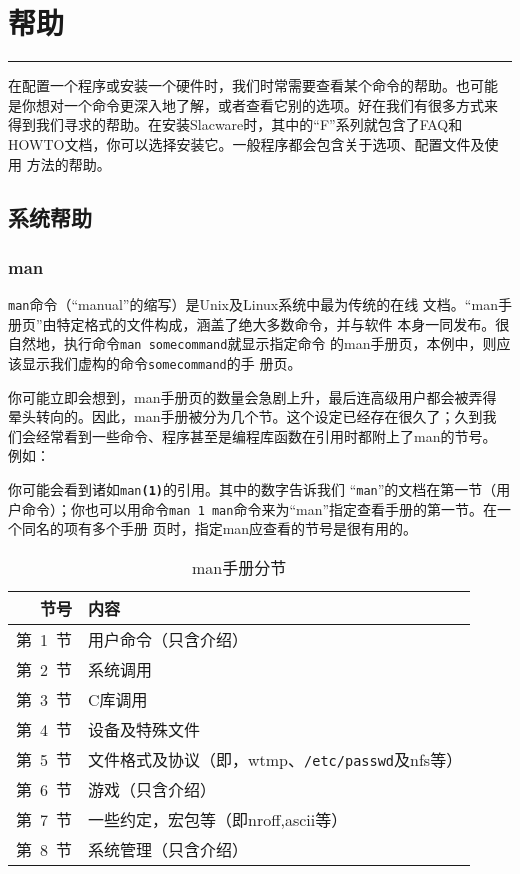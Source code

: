 
\chapter{帮助}
\label{chap:help}

\begin{flushleft}
\rule[0mm]{\textwidth}{.1pt}
\end{flushleft}

在配置一个程序或安装一个硬件时，我们时常需要查看某个命令的帮助。也可能
是你想对一个命令更深入地了解，或者查看它别的选项。好在我们有很多方式来
得到我们寻求的帮助。在安装Slacware时，其中的``F''系列就包含了FAQ和
HOWTO文档，你可以选择安装它。一般程序都会包含关于选项、配置文件及使用
方法的帮助。

\section{系统帮助}
\label{sec:help:systemHelp}

\subsection{man}
\label{sec:help:systemHelp:man}

\texttt{man}命令（``manual''的缩写）是Unix及Linux系统中最为传统的在线
文档。``man手册页''由特定格式的文件构成，涵盖了绝大多数命令，并与软件
本身一同发布。很自然地，执行命令\texttt{man somecommand}就显示指定命令
的man手册页，本例中，则应该显示我们虚构的命令\texttt{somecommand}的手
册页。

你可能立即会想到，man手册页的数量会急剧上升，最后连高级用户都会被弄得
晕头转向的。因此，man手册被分为几个节。这个设定已经存在很久了；久到我
们会经常看到一些命令、程序甚至是编程库函数在引用时都附上了man的节号。
例如：

你可能会看到诸如\texttt{man\textbf{(1)}}的引用。其中的数字告诉我们
``\texttt{man}''的文档在第一节（用户命令）；你也可以用命令\texttt{man
  1 man}命令来为``man''指定查看手册的第一节。在一个同名的项有多个手册
页时，指定man应查看的节号是很有用的。

\begin{table}[hpbf]
  \centering
  \begin{tabular}{rl}
    \hline \hline 
    \textbf{节号} & \textbf{内容} \\ \hline 
    第~1~节 & 用户命令（只含介绍） \\
    第~2~节 & 系统调用 \\
    第~3~节 & C库调用 \\
    第~4~节 & 设备及特殊文件 \\
    第~5~节 & 文件格式及协议（即，wtmp、\texttt{/etc/passwd}及nfs等）
    \\
    第~6~节 & 游戏（只含介绍） \\
    第~7~节 & 一些约定，宏包等（即nroff,ascii等） \\
    第~8~节 & 系统管理（只含介绍） \\
    \hline \hline
    
  \end{tabular}
  \caption{man手册分节}
  \label{tab:manPageSections}
\end{table}

